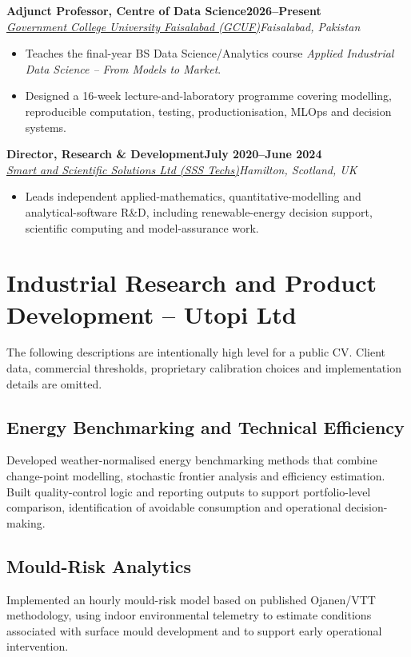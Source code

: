 \documentclass[10pt,a4paper]{article}
\newcommand{\cvrole}[4]{\textbf{#1}\hfill\textbf{#2}\\[-1pt]\textit{#3}\hfill\textit{#4}\par}
\begin{document}
\cvrole{Adjunct Professor, Centre of Data Science}{2026--Present}{\href{https://gcuf.edu.pk/faculties/physical-science/data-science/}{Government College University Faisalabad (GCUF)}}{Faisalabad, Pakistan}
\begin{itemize}
\item Teaches the final-year BS Data Science/Analytics course \textit{Applied Industrial Data Science -- From Models to Market}.
\item Designed a 16-week lecture-and-laboratory programme covering modelling, reproducible computation, testing, productionisation, MLOps and decision systems.
\end{itemize}

\cvrole{Director, Research \& Development}{July 2020--June 2024}{\href{https://www.ssstechs.com/}{Smart and Scientific Solutions Ltd (SSS Techs)}}{Hamilton, Scotland, UK}
\begin{itemize}
\item Leads independent applied-mathematics, quantitative-modelling and analytical-software R\&D, including renewable-energy decision support, scientific computing and model-assurance work.
\end{itemize}

\section{Industrial Research and Product Development -- Utopi Ltd}
The following descriptions are intentionally high level for a public CV. Client data, commercial thresholds, proprietary calibration choices and implementation details are omitted.

\subsection{Energy Benchmarking and Technical Efficiency}
Developed weather-normalised energy benchmarking methods that combine change-point modelling, stochastic frontier analysis and efficiency estimation. Built quality-control logic and reporting outputs to support portfolio-level comparison, identification of avoidable consumption and operational decision-making.

\subsection{Mould-Risk Analytics}
Implemented an hourly mould-risk model based on published Ojanen/VTT methodology, using indoor environmental telemetry to estimate conditions associated with surface mould development and to support early operational intervention.
\end{document}
